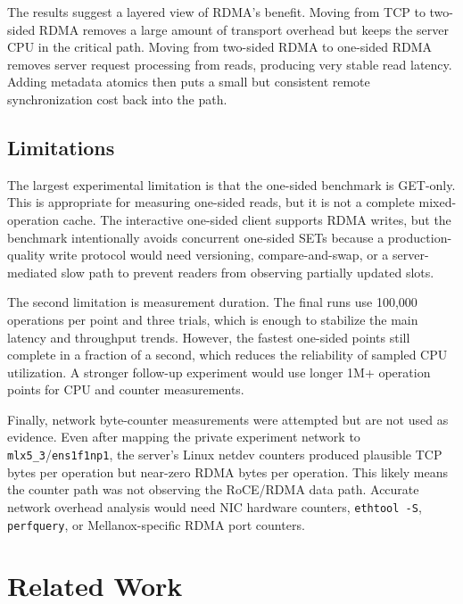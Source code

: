 \documentclass[letterpaper,twocolumn,10pt]{article}
\begin{document}
The results suggest a layered view of RDMA's benefit.  Moving from TCP to
two-sided RDMA removes a large amount of transport overhead but keeps the
server CPU in the critical path.  Moving from two-sided RDMA to one-sided RDMA
removes server request processing from reads, producing very stable read
latency.  Adding metadata atomics then puts a small but consistent remote
synchronization cost back into the path. 

\subsection{Limitations}

The largest experimental limitation is that the one-sided benchmark is
GET-only.  This is appropriate for measuring one-sided reads, but it is not a
complete mixed-operation cache.  The interactive one-sided client supports
RDMA writes, but the benchmark intentionally avoids concurrent one-sided SETs
because a production-quality write protocol would need versioning,
compare-and-swap, or a server-mediated slow path to prevent readers from
observing partially updated slots.

The second limitation is measurement duration.  The final runs use 100,000
operations per point and three trials, which is enough to stabilize the main
latency and throughput trends.  However, the fastest one-sided points still
complete in a fraction of a second, which reduces the reliability of sampled
CPU utilization.  A stronger follow-up experiment would use longer 1M+
operation points for CPU and counter measurements.

Finally, network byte-counter measurements were attempted but are not used as
evidence.  Even after mapping the private experiment network to
\texttt{mlx5\_3}/\texttt{ens1f1np1}, the server's Linux netdev counters
produced plausible TCP bytes per operation but near-zero RDMA bytes per
operation.  This likely means the counter path was not observing the
RoCE/RDMA data path.  Accurate network overhead analysis would need NIC
hardware counters, \texttt{ethtool -S}, \texttt{perfquery}, or
Mellanox-specific RDMA port counters.

\section{Related Work}
\end{document}
